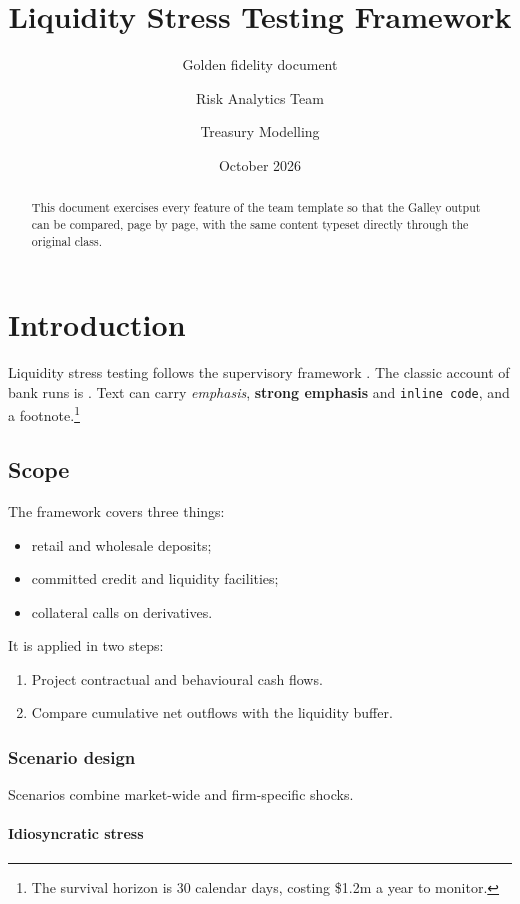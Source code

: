 \documentclass{whitepaper}
\title{Liquidity Stress Testing Framework}
\subtitle{Golden fidelity document}
\author{Risk Analytics Team \and Treasury Modelling}
\date{October 2026}
\begin{document}
\maketitle

\begin{abstract}
This document exercises every feature of the team template so that the
Galley output can be compared, page by page, with the same content typeset
directly through the original class.
\end{abstract}

\section{Introduction}\label{sec-intro}

Liquidity stress testing follows the supervisory framework
\citep{bcbs2013}. The classic account of bank runs is
\citet{diamond1983}. Text can carry \emph{emphasis}, \textbf{strong
emphasis} and \texttt{inline code}, and a footnote.\footnote{The survival
horizon is 30 calendar days, costing \$1.2m a year to monitor.}

\subsection{Scope}

The framework covers three things:

\begin{itemize}
\item retail and wholesale deposits;
\item committed credit and liquidity facilities;
\item collateral calls on derivatives.
\end{itemize}

It is applied in two steps:

\begin{enumerate}
\item Project contractual and behavioural cash flows.
\item Compare cumulative net outflows with the liquidity buffer.
\end{enumerate}

\subsubsection{Scenario design}

Scenarios combine market-wide and firm-specific shocks.

\paragraph{Idiosyncratic stress}
\end{document}
